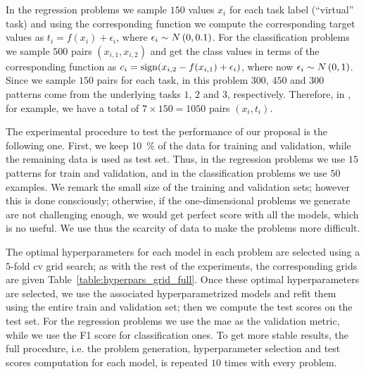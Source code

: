 %
In the regression problems we sample $150$ values $x_i$ for each task label (``virtual'' task) and using the corresponding function we compute the corresponding target values as $t_i = f(x_i) + \epsilon_i$, where $\epsilon_i \sim N \left(0, 0.1\right)$.
For the classification problems we sample $500$ pairs $(x_{i,1}, x_{i,2})$ and get the class values in terms of the corresponding function as $c_i = \operatorname{sign}(x_{i,2} - f(x_{i,1}) + \epsilon_i)$, where now $\epsilon_i \sim N \left(0, 1\right)$.
%
Since we sample $150$ pairs for each task, in this problem $300$, $450$ and $300$ patterns come from the underlying tasks $1$, $2$ and $3$, respectively.
%
Therefore, in , for example, we have a total of $7 \times 150 = \num{1050}$ pairs $(x_i, t_i)$. 

The experimental procedure to test the performance of our proposal is the following one.
First, we keep \SI{10}{\percent} of the data for training and validation, while the remaining data is used as test set. Thus, in the regression problems we use $15$ patterns for train and validation, and in the classification problems we use $50$ examples.
%
We remark the small size of the training and validation sets; however this is done consciously; otherwise, if the one-dimensional problems we generate are not challenging enough, we would get perfect score with all the models, which is no useful. We use thus the scarcity of data to make the problems more difficult.
%

The optimal hyperparameters for each model in each problem are selected using a $5$-fold \acrshort{cv} grid search; as with the rest of the experiments, the corresponding grids are given Table~\ref{table:hyperpars_grid_full}.
%
Once these optimal hyperparameters are selected, we use the associated hyperparametrized models and refit them using the entire train and validation set; then we compute the test scores on the test set.
%
For the regression problems we use the \acrshort{mae} as the validation metric, while we use the F1 score for classification ones.
%
To get more stable results, the full procedure, i.e. the problem generation, hyperparameter selection and test scores computation for each model, is repeated $10$ times with every problem.
%

